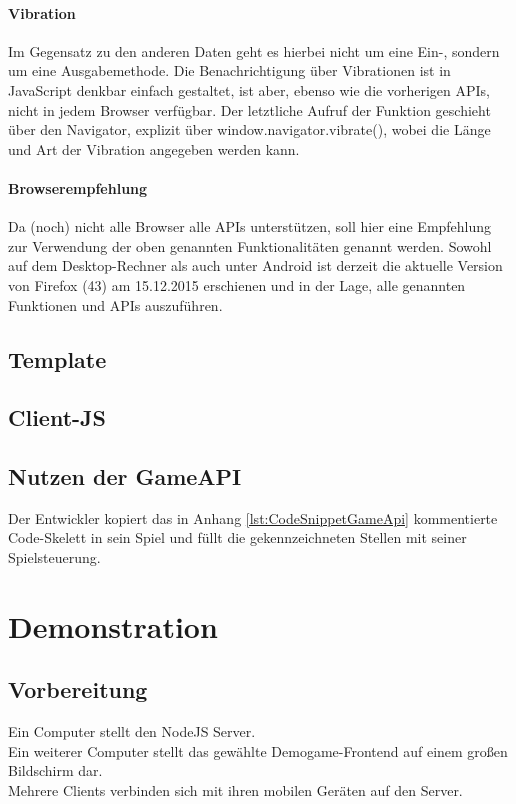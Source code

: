 \documentclass[a4paper]{spie}  %
\begin{document}
\paragraph{Vibration}
Im Gegensatz zu den anderen Daten geht es hierbei nicht um eine Ein-, sondern um eine Ausgabemethode. Die Benachrichtigung über Vibrationen ist in JavaScript denkbar einfach gestaltet, ist aber, ebenso wie die vorherigen APIs, nicht in jedem Browser verfügbar. Der letztliche Aufruf der Funktion geschieht über den Navigator, explizit über window.navigator.vibrate(), wobei die Länge und Art der Vibration angegeben werden kann.

\paragraph{Browserempfehlung}
Da (noch) nicht alle Browser alle APIs unterstützen, soll hier eine Empfehlung zur Verwendung der oben genannten Funktionalitäten genannt werden. Sowohl auf dem Desktop-Rechner als auch unter Android ist derzeit die aktuelle Version von Firefox (43) am 15.12.2015 erschienen und in der Lage, alle genannten Funktionen und APIs auszuführen.

\subsection{Template} %
\subsection{Client-JS} %

\subsection{Nutzen der GameAPI}
Der Entwickler kopiert das in Anhang \ref{lst:CodeSnippetGameApi} kommentierte Code-Skelett in sein Spiel und füllt die gekennzeichneten Stellen mit seiner Spielsteuerung.


\section{Demonstration}
\subsection{Vorbereitung}
Ein Computer stellt den NodeJS Server.\\
Ein weiterer Computer stellt das gewählte Demogame-Frontend auf einem großen Bildschirm dar.\\
Mehrere Clients verbinden sich mit ihren mobilen Geräten auf den Server.\\
\end{document}

